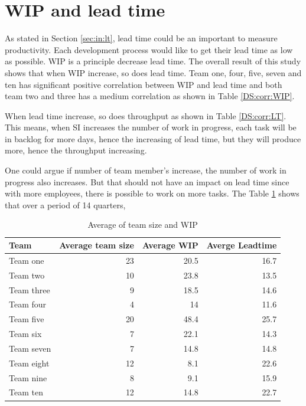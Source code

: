 \documentclass[UKenglish]{ifimaster}  %
\begin{document}
 


\section{WIP and lead time}
As stated in Section \ref{sec:in:lt}, lead time could be an important to measure productivity. Each development process would like to get their lead time as low as possible. WIP is a principle decrease lead time.  The overall result of this study shows that when WIP increase, so does lead time. Team one, four, five, seven and ten has significant positive correlation between WIP and lead time and both team two and three has a medium correlation as shown in Table \ref{DS:corr:WIP}. 


When lead time increase, so does throughput as shown in Table \ref{DS:corr:LT}. This means, when SI increases the number of work in progress, each task will be in backlog for more days, hence the increasing of lead time, but they will produce more, hence the throughput increasing. 


One could argue if number of team member's increase, the number of work in progress also increases. But that should not have an impact on lead time since with more employees, there is possible to work on more tasks.  The Table \ref{DS:corr:WIP:Team:LT} shows that over a period of 14 quarters,

 \begin{table}[!htbp]
 \centering
 \begin{tabular}{|l|r|r|r|}
  \hline
  \textbf{Team} & \textbf{Average team size} & \textbf{Average WIP} & \textbf{Averge Leadtime}\\ \hline
Team one & 23 & 20.5 &   16.7\\ \hline
Team two & 10 & 23.8 &  13.5\\ \hline
Team three & 9 &  18.5  & 14.6\\ \hline
Team four & 4 &  14  & 11.6\\ \hline
Team five & 20 &  48.4  & 25.7\\ \hline
Team six & 7 &  22.1  & 14.3\\ \hline
Team seven & 7 & 14.8  & 14.8\\ \hline
Team eight & 12 &  8.1 & 22.6\\ \hline
Team nine  & 8 &  9.1  & 15.9\\ \hline
Team ten & 12 &  14.8 &  22.7\\ \hline
 \end{tabular}
 \caption{Average of team size and WIP}
 \label{DS:corr:WIP:Team:LT}
 \end{table}
\end{document}
